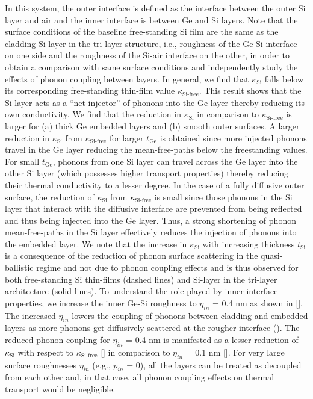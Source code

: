 In this system, the outer interface is defined as the interface between the outer Si layer and air and the inner interface is between Ge and Si layers. Note that the surface conditions of the baseline free-standing Si film are the same as the cladding Si layer in the tri-layer structure, i.e., roughness of the Ge-Si interface on one side and the roughness of the Si-air interface on the other, in order to obtain a comparison with same surface conditions and independently study the effects of phonon coupling between layers. In general, we find that $\kappa_{\text{Si}}$ falls below its corresponding free-standing thin-film value $\kappa_{\text{Si-free}}$. This result shows that the Si layer acts as a “net injector” of phonons into the Ge layer thereby reducing its own conductivity. We find that the reduction in $\kappa_{\text{Si}}$ in comparison to $\kappa_{\text{Si-free}}$ is larger for (a) thick Ge embedded layers and (b) smooth outer surfaces. A larger reduction in $\kappa_{\text{Si}}$ from $\kappa_{\text{Si-free}}$ for larger $t_{\text{Ge}}$ is obtained since more injected phonons travel in the Ge layer reducing the mean-free-paths below the freestanding values. For small $t_{\text{Ge}}$, phonons from one Si layer can travel across the Ge layer into the other Si layer (which possesses higher transport properties) thereby reducing their thermal conductivity to a lesser degree. In the case of a fully diffusive outer surface, the reduction of $\kappa_{\text{Si}}$ from $\kappa_{\text{Si-free}}$ is small since those phonons in the Si layer that interact with the diffusive interface are prevented from being reflected and thus being injected into the Ge layer. Thus, a strong shortening of phonon mean-free-paths in the Si layer effectively reduces the injection of phonons into the embedded layer. We note that the increase in $\kappa_{\text{Si}}$ with increasing thickness $t_{\text{Si}}$ is a consequence of the reduction of phonon surface scattering in the quasi-ballistic regime and not due to phonon coupling effects and is thus observed for both free-standing Si thin-films (dashed lines) and Si-layer in the tri-layer architecture (solid lines). To understand the role played by inner interface properties, we increase the inner Ge-Si roughness to $\eta_{in}$ = 0.4 nm as shown in []. The increased $\eta_{in}$ lowers the coupling of phonons between cladding and embedded layers as more phonons get diffusively scattered at the rougher interface (). The reduced phonon coupling for $\eta_{in}$ = 0.4 nm is manifested as a lesser reduction of $\kappa_{\text{Si}}$ with respect to $\kappa_{\text{Si-free}}$ [] in comparison to $\eta_{in}$ = 0.1 nm []. For very large surface roughnesses $\eta_{in}$ (e.g., $p_{in}$ = 0), all the layers can be treated as decoupled from each other and, in that case, all phonon coupling effects on thermal transport would be negligible. 
